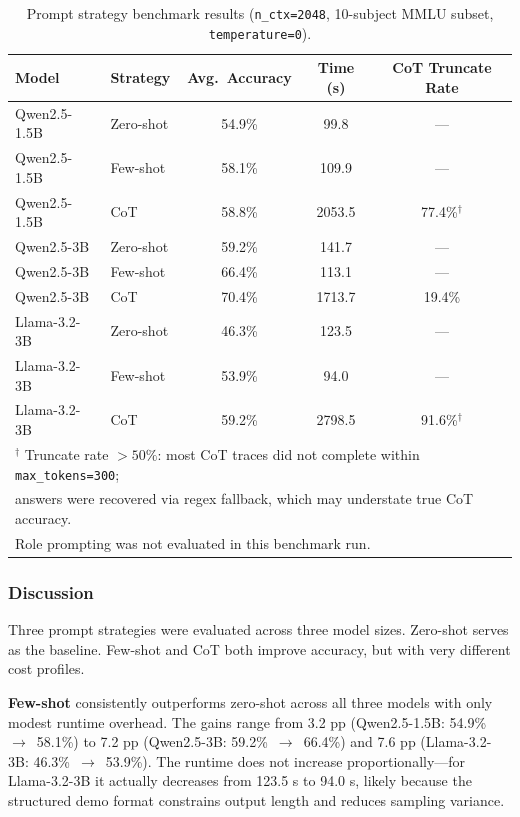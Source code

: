 \documentclass[12pt, a4paper]{article}
\begin{document}
\begin{table}[H]
\centering
\caption{Prompt strategy benchmark results (\texttt{n\_ctx=2048}, 10-subject MMLU subset, \texttt{temperature=0}).}
\label{tab:prompt_results}
\begin{tabular}{llccc}
\toprule
Model & Strategy & Avg.\ Accuracy & Time (s) & CoT Truncate Rate \\
\midrule
Qwen2.5-1.5B & Zero-shot & 54.9\% & \phantom{0}99.8  & --- \\
Qwen2.5-1.5B & Few-shot  & 58.1\% & 109.9            & --- \\
Qwen2.5-1.5B & CoT       & 58.8\% & 2053.5           & 77.4\%$^\dagger$ \\
\midrule
Qwen2.5-3B   & Zero-shot & 59.2\% & 141.7            & --- \\
Qwen2.5-3B   & Few-shot  & 66.4\% & 113.1            & --- \\
Qwen2.5-3B   & CoT       & 70.4\% & 1713.7           & 19.4\% \\
\midrule
Llama-3.2-3B & Zero-shot & 46.3\% & 123.5            & --- \\
Llama-3.2-3B & Few-shot  & 53.9\% & \phantom{0}94.0  & --- \\
Llama-3.2-3B & CoT       & 59.2\% & 2798.5           & 91.6\%$^\dagger$ \\
\bottomrule
\multicolumn{5}{l}{$^\dagger$ Truncate rate $>50\%$: most CoT traces did not complete within \texttt{max\_tokens=300};} \\
\multicolumn{5}{l}{\quad answers were recovered via regex fallback, which may understate true CoT accuracy.} \\
\multicolumn{5}{l}{Role prompting was not evaluated in this benchmark run.} \\
\end{tabular}
\end{table}

\subsubsection{Discussion}

Three prompt strategies were evaluated across three model sizes. Zero-shot serves as the baseline. Few-shot and CoT both improve accuracy, but with very different cost profiles.

\textbf{Few-shot} consistently outperforms zero-shot across all three models with only modest runtime overhead. The gains range from 3.2 pp (Qwen2.5-1.5B: 54.9\%~$\to$~58.1\%) to 7.2 pp (Qwen2.5-3B: 59.2\%~$\to$~66.4\%) and 7.6 pp (Llama-3.2-3B: 46.3\%~$\to$~53.9\%). The runtime does not increase proportionally---for Llama-3.2-3B it actually decreases from 123.5 s to 94.0 s, likely because the structured demo format constrains output length and reduces sampling variance.
\end{document}
